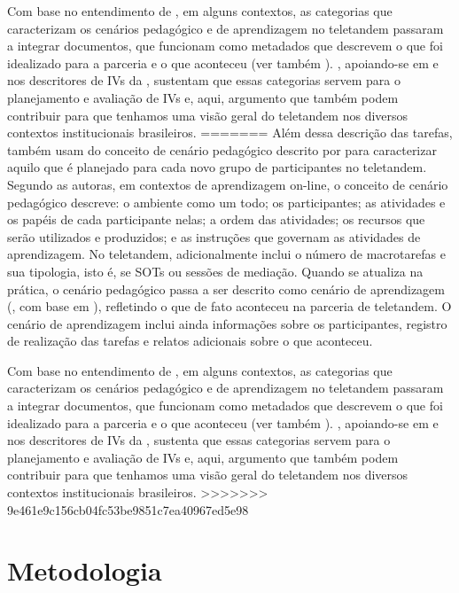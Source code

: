 \documentclass[portuguese]{textolivre}
\begin{document}
Com base no entendimento de \textcite{aranha2017}, em alguns contextos, as categorias que caracterizam os cenários pedagógico e de aprendizagem no teletandem passaram a integrar documentos, que funcionam como metadados que descrevem o que foi idealizado para a parceria e o que aconteceu (ver também \textcite{lopes2019}). \textcite{rampazzamoore2024b}, apoiando-se em \textcite{aranha2017} e nos descritores de IVs da \textcite{stevens2021}, sustentam que essas categorias servem para o planejamento e avaliação de IVs e, aqui, argumento que também podem contribuir para que tenhamos uma visão geral do teletandem nos diversos contextos institucionais brasileiros.
=======
Além dessa descrição das tarefas, \cite{aranha2017} também usam do conceito de cenário pedagógico descrito por \textcite{chanier2016} para caracterizar aquilo que é planejado para cada novo grupo de participantes no teletandem. Segundo as autoras, em contextos de aprendizagem on-line, o conceito de cenário pedagógico descreve: o ambiente como um todo; os participantes; as atividades e os papéis de cada participante nelas; a ordem das atividades; os recursos que serão utilizados e produzidos; e as instruções que governam as atividades de aprendizagem. No teletandem, adicionalmente inclui o número de macrotarefas e sua tipologia, isto é, se SOTs ou sessões de mediação. Quando se atualiza na prática, o cenário pedagógico passa a ser descrito como cenário de aprendizagem (\textcite{aranha2017}, com base em \textcite{foucher2010}), refletindo o que de fato aconteceu na parceria de teletandem. O cenário de aprendizagem inclui ainda informações sobre os participantes, registro de realização das tarefas e relatos adicionais sobre o que aconteceu.

Com base no entendimento de \textcite{aranha2017}, em alguns contextos, as categorias que caracterizam os cenários pedagógico e de aprendizagem no teletandem passaram a integrar documentos, que funcionam como metadados que descrevem o que foi idealizado para a parceria e o que aconteceu (ver também \textcite{lopes2019}). \textcite{rampazzamoore2024b}, apoiando-se em \textcite{aranha2017} e nos descritores de IVs da \textcite{stevens2021}, sustenta que essas categorias servem para o planejamento e avaliação de IVs e, aqui, argumento que também podem contribuir para que tenhamos uma visão geral do teletandem nos diversos contextos institucionais brasileiros.
>>>>>>> 9e461e9c156cb04fc53be9851c7ea40967ed5e98


\section{Metodologia}\label{metodologia}
\end{document}
